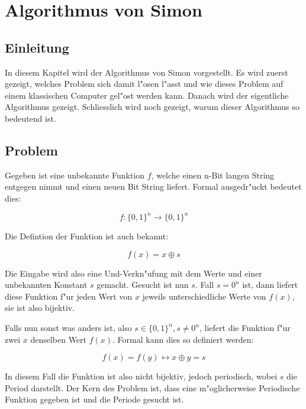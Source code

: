 \chapter{Algorithmus von Simon\label{chapter:simon}} 
\begin{refsection} 

\section{Einleitung} 

In diesem Kapitel wird der Algorithmus von Simon vorgestellt.  Es wird zuerst
gezeigt, welches Problem sich damit l"osen l"asst und wie dieses Problem auf
einem klassischen Computer gel"ost werden kann. Danach wird der eigentliche
Algorithmus gezeigt. Schliesslich wird noch gezeigt, warum dieser Algorithmus so
bedeutend ist.

\section{Problem} 

Gegeben ist eine unbekannte Funktion $f$, welche einen n-Bit langen String
entgegen nimmt und einen neuen Bit String liefert. Formal ausgedr"uckt bedeutet
dies:

\[
    f\colon\{0,1\}^n\to\{0,1\}^n
\]

Die Defintion der Funktion ist auch bekannt:

\[
    f(x) = x \oplus s
\]

Die Eingabe wird also eine Und-Verkn"ufung mit dem Werte und einer unbekannten
Konstant $s$ gemacht.  Gesucht ist nun $s$. Fall $s = 0^n$ ist, dann liefert
diese Funktion f"ur jeden Wert von $x$ jeweils unterschiedliche Werte von
$f(x)$, sie ist also bijektiv.

Falls nun sonst was anders ist, also $s \in \{0,1\}^n, s \neq 0^n$, liefert die
Funktion f"ur zwei $x$ denselben Wert $f(x)$. Formal kann dies so definiert
werden:

\[ 
    f(x) = f(y) \leftrightarrow x \oplus y = s 
\]

In diesem Fall die Funktion ist also nicht bijektiv, jedoch periodisch, wobei
$s$ die Period darstellt. Der Kern des Problem ist, dass eine m"oglicherweise
Periodische Funktion gegeben ist und die Periode gesucht ist.



\end{refsection}
